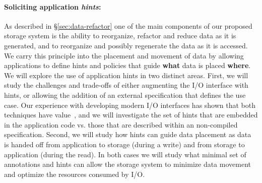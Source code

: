 \paragraph{Soliciting application {\em hints}:}
As described in \S\ref{sec:data-refactor} one of the main components of our
proposed storage system is the ability to reorganize, refactor and reduce data 
as it is generated, and to reorganize and possibly regenerate the data as it is accessed. 
We carry this principle into the placement and movement of data by allowing
applications to define hints and policies that guide \textbf{what} data is
placed \textbf{where}. We will explore the use of application hints in two
distinct areas. First, we will study the challenges and trade-offs of either
augmenting the I/O interface with hints, or allowing the addition of an
external specification that defines the use case. Our experience with
developing modern I/O interfaces has shown that both techniques 
have value~\cite{tongipdps15,qiansc15}, and we will investigate the set of hints that are embedded in the
application code vs. those that are described within an non-compiled
specification. Second, we will study how hints can guide data
placement as data is handed off from application to storage (during a
write) and from storage to application (during the read). In both cases we
will study what minimal set of annotations and hints can allow the storage
system to minimize data movement and optimize the resources consumed by I/O. 



